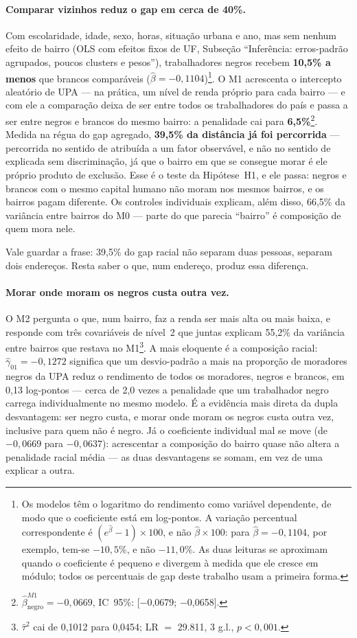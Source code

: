 \documentclass[11pt, a4paper, oneside]{article}
\begin{document}
\paragraph{Comparar vizinhos reduz o gap em cerca de 40\%.}
Com escolaridade, idade, sexo, horas, situação urbana e ano, mas {sem} nenhum
efeito de bairro (OLS com efeitos fixos de UF, Subseção ``Inferência: erros-padrão agrupados, poucos clusters e pesos''),
trabalhadores negros recebem \textbf{10,5\% a menos} que brancos comparáveis
($\hat\beta = −0,1104$)\footnote{Os modelos têm o logaritmo do rendimento como variável dependente, de modo que o coeficiente está em log-pontos. A variação percentual correspondente é $(e^{\hat\beta}-1)\times 100$, e não $\hat\beta\times 100$: para $\hat\beta=-0{,}1104$, por exemplo, tem-se $-10{,}5\%$, e não $-11{,}0\%$. As duas leituras se aproximam quando o coeficiente é pequeno e divergem à medida que ele cresce em módulo; todos os percentuais de gap deste trabalho usam a primeira forma.}. O M1 acrescenta o intercepto aleatório de UPA --- na
prática, um nível de renda próprio para cada bairro --- e com ele a comparação deixa de
ser entre todos os trabalhadores do país e passa a ser entre negros e brancos {do
mesmo bairro}: a penalidade cai para \textbf{6,5\%}\footnote{$\hat\beta_{\text{negro}}^{M1} = −0,0669$, IC~95\%: [−0,0679; −0,0658].}. Medida na régua do gap agregado,
\textbf{39,5\% da distância já foi percorrida} --- percorrida no sentido de
atribuída a um fator observável, e não no sentido de explicada sem discriminação, já que
o bairro em que se consegue morar é ele próprio produto de exclusão. Esse é o teste da
Hipótese~H1, e ele passa: negros e brancos com o mesmo capital humano não moram nos
mesmos bairros, e os bairros pagam diferente. Os controles individuais explicam, além
disso, 66,5\% da variância entre bairros do M0 --- parte do que parecia
``bairro'' é composição de quem mora nele.

\noindent Vale guardar a frase: 39{,}5\% do gap racial não separam duas pessoas,
separam dois endereços. Resta saber o que, num endereço, produz essa diferença.

\paragraph{Morar onde moram os negros custa outra vez.}
O M2 pergunta o que, num bairro, faz a renda ser mais alta ou mais baixa, e responde com
três covariáveis de nível~2 que juntas explicam 55,2\% da variância
entre bairros que restava no M1\footnote{$\hat\tau^2$ cai de 0,1012 para
0,0454; LR $=$ 29.811, 3 g.l., $p<0{,}001$.}. A mais eloquente é a
composição racial: $\hat\gamma_{01} = −0,1272$ significa que um desvio-padrão a mais
na proporção de moradores negros da UPA reduz o rendimento de {todos} os moradores,
negros e brancos, em 0,13 log-pontos --- cerca de 2{,}0 vezes a
penalidade que um trabalhador negro carrega individualmente no mesmo modelo. É a evidência
mais direta da {dupla desvantagem}: ser negro custa, e morar onde moram os negros
custa outra vez, inclusive para quem não é negro. Já o coeficiente individual mal se move
(de $−0,0669$ para $−0,0637$): acrescentar a composição do bairro quase não altera a
penalidade racial média --- as duas desvantagens se somam, em vez de uma explicar a outra.
\end{document}

